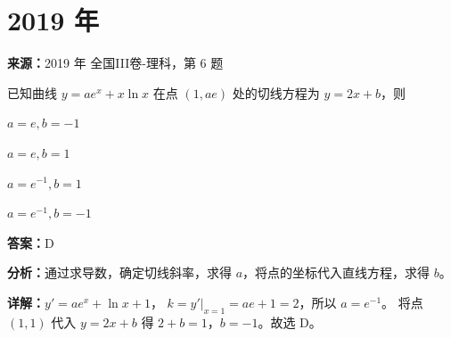 \section*{2019 年}

\begin{question}[points=5]
\textbf{来源：}2019 年 全国III卷-理科，第 6 题\par
已知曲线 $y = ae^x + x\ln x$ 在点 $(1,ae)$ 处的切线方程为 $y=2x+b$，则
\begin{choices}
  \item $a=e, b=-1$
  \item $a=e, b=1$
  \item $a=e^{-1}, b=1$
  \item $a=e^{-1}, b=-1$
\end{choices}
\begin{solution}
\textbf{答案：}D

\textbf{分析：}通过求导数，确定切线斜率，求得 $a$，将点的坐标代入直线方程，求得 $b$。

\textbf{详解：}$y' = ae^x + \ln x + 1$，
$k = y'|_{x=1} = ae + 1 = 2$，所以 $a = e^{-1}$。
将点 $(1,1)$ 代入 $y=2x+b$ 得 $2+b=1$，$b=-1$。故选 D。
\end{solution}
\end{question}

